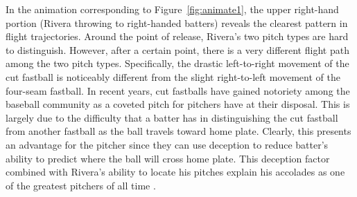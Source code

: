 \begin{article}
In the animation corresponding to Figure~\ref{fig:animate1}, the
upper right-hand portion (Rivera throwing to right-handed batters)
reveals the clearest pattern in flight trajectories. Around the point
of release, Rivera's two pitch types are hard to distinguish. However,
after a certain point, there is a very different flight path among
the two pitch types. Specifically, the drastic left-to-right movement
of the cut fastball is noticeably different from the slight right-to-left
movement of the four-seam fastball. In recent years, cut fastballs
have gained notoriety among the baseball community as a coveted pitch
for pitchers have at their disposal. This is largely due to the difficulty
that a batter has in distinguishing the cut fastball from another
fastball as the ball travels toward home plate. Clearly, this presents
an advantage for the pitcher since they can use deception to reduce
batter's ability to predict where the ball will cross home plate.
This deception factor combined with Rivera's ability to locate his
pitches explain his accolades as one of the greatest pitchers of all
time \citep{NYT}.


\end{article}
